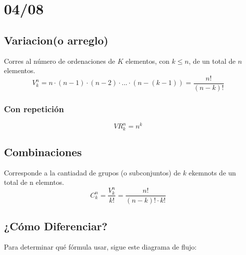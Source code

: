 \documentclass[12pt, letterpaper]{article}
\begin{document}
\section{04/08}
    \subsection{Variacion(o arreglo)}
        Corres al número de ordenaciones de $K$ elementos, con $k \leq n$, de un total de $n$ elementos.
        \[V_k^n = n \cdot (n - 1) \cdot (n - 2) \cdot ... \cdot (n - (k - 1)) = \frac{n!}{(n - k)!} \]
        \subsubsection*{Con repetición}
            \[VR_k^n = n^k \]
    \subsection{Combinaciones} Corresponde a la cantiadad de grupos (o subconjuntos) de $k$ ekemnots de un total de n elemntos. 
        \[C_k^n = \frac{V_k^n}{k!} = \frac{n!}{(n - k)! \cdot k!} \]

    \subsection*{¿Cómo Diferenciar?}
Para determinar qué fórmula usar, sigue este diagrama de flujo:
\end{document}

